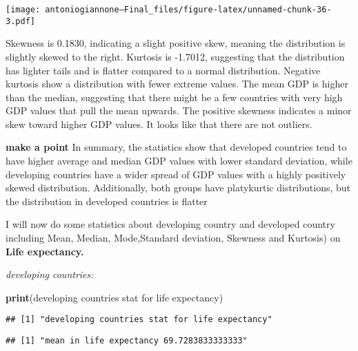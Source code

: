 \documentclass[
]{article}
\newenvironment{Shaded}{\begin{snugshade}}{\end{snugshade}}
\newcommand{\FunctionTok}[1]{\textcolor[rgb]{0.13,0.29,0.53}{\textbf{#1}}}
\newcommand{\NormalTok}[1]{#1}
\newcommand{\SpecialCharTok}[1]{\textcolor[rgb]{0.81,0.36,0.00}{\textbf{#1}}}
\newcommand{\StringTok}[1]{\textcolor[rgb]{0.31,0.60,0.02}{#1}}
\begin{document}
\texttt{[image: antoniogiannone---Final\_files/figure-latex/unnamed-chunk-36-3.pdf]}

Skewness is 0.1830, indicating a slight positive skew, meaning the
distribution is slightly skewed to the right. Kurtosis is -1.7012,
suggesting that the distribution has lighter tails and is flatter
compared to a normal distribution. Negative kurtosis show a distribution
with fewer extreme values. The mean GDP is higher than the median,
suggesting that there might be a few countries with very high GDP values
that pull the mean upwards. The positive skewness indicates a minor skew
toward higher GDP values. It looks like that there are not outliers.

\textbf{make a point} In summary, the statistics show that developed
countries tend to have higher average and median GDP values with lower
standard deviation, while developing countries have a wider spread of
GDP values with a highly positively skewed distribution. Additionally,
both groups have platykurtic distributions, but the distribution in
developed countries is flatter

I will now do some statistics about developing country and developed
country including Mean, Median, Mode,Standard deviation, Skewness and
Kurtosis) on \textbf{Life expectancy.}

\emph{developing countries:}

\begin{Shaded}
\begin{Highlighting}[]
\FunctionTok{print}\NormalTok{(}\StringTok{\textquotesingle{}developing countries stat for life expectancy\textquotesingle{}}\NormalTok{)}
\end{Highlighting}
\end{Shaded}

\begin{verbatim}
## [1] "developing countries stat for life expectancy"
\end{verbatim}

\begin{Shaded}
\end{Shaded}

\begin{verbatim}
## [1] "mean in life expectancy 69.7283833333333"
\end{verbatim}
\end{document}
